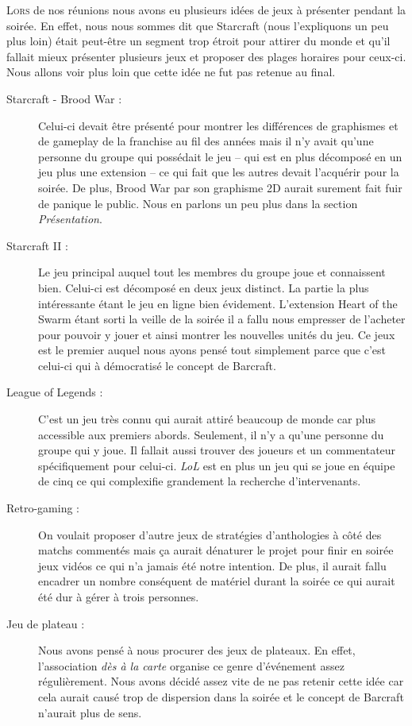 \lettrine{L}{ors} de nos réunions nous avons eu plusieurs idées de jeux
à présenter pendant la soirée. En effet, nous nous sommes dit que
Starcraft (nous l'expliquons un peu plus loin) était peut-être un
segment trop étroit pour attirer du monde et qu'il fallait mieux
présenter plusieurs jeux et proposer des plages horaires pour ceux-ci.
Nous allons voir plus loin que cette idée ne fut pas retenue au final.

\begin{description}

\item[Starcraft - Brood War :] Celui-ci devait être présenté pour
montrer les différences de graphismes et de gameplay de la franchise au
fil des années mais il n'y avait qu'une personne du groupe qui possédait
le jeu -- qui est en plus décomposé en un jeu plus une extension -- ce
qui fait que les autres devait l'acquérir pour la soirée.  De plus, \og
Brood War \fg{} par son graphisme 2D aurait surement fait fuir de
panique le public. Nous en parlons un peu plus dans la section
\emph{Présentation}.

\item[Starcraft II :] Le jeu principal auquel tout les membres du groupe
joue et connaissent bien. Celui-ci est décomposé en deux jeux distinct.
La partie la plus intéressante étant le jeu en ligne bien évidement.
L'extension \og Heart of the Swarm \fg{} étant sorti la veille de la
soirée il a fallu nous empresser de l'acheter pour pouvoir y jouer et
ainsi montrer les nouvelles unités du jeu. Ce jeux est le premier auquel
nous ayons pensé tout simplement parce que c'est celui-ci qui à
démocratisé le concept de Barcraft.

\item[League of Legends :] C'est un jeu très connu qui aurait attiré
beaucoup de monde car plus accessible aux premiers abords. Seulement, il
n'y a qu'une personne du groupe qui y joue. Il fallait aussi trouver des
joueurs et un commentateur spécifiquement pour celui-ci. \emph{LoL} est en plus
un jeu qui se joue en équipe de cinq ce qui complexifie grandement la
recherche d'intervenants.

\item[Retro-gaming :] On voulait proposer d'autre jeux de stratégies
d'anthologies à côté des matchs commentés mais ça aurait dénaturer le
projet pour finir en soirée jeux vidéos ce qui n'a jamais été notre
intention. De plus, il aurait fallu encadrer un nombre conséquent de
matériel durant la soirée ce qui aurait été dur à gérer à trois
personnes.

\item[Jeu de plateau :] Nous avons pensé à nous procurer des jeux de
plateaux. En effet, l'association \emph{dès à la carte} organise ce
genre d'événement assez régulièrement. Nous avons décidé assez vite de
ne pas retenir cette idée car cela aurait causé trop de dispersion dans
la soirée et le concept de Barcraft n'aurait plus de sens.

\end{description}

